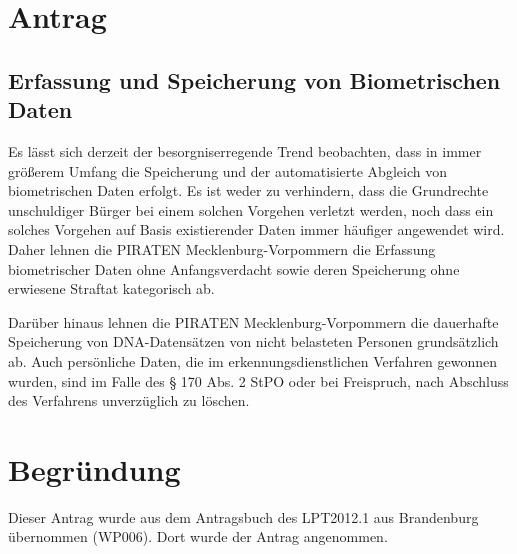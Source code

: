 \section{Antrag}

\subsection{Erfassung und Speicherung von Biometrischen Daten}

Es lässt sich derzeit der besorgniserregende Trend beobachten, dass in immer größerem Umfang die Speicherung und der automatisierte Abgleich von biometrischen Daten erfolgt. Es ist weder zu verhindern, dass die Grundrechte unschuldiger Bürger bei einem solchen Vorgehen verletzt werden, noch dass ein solches Vorgehen auf Basis existierender Daten immer häufiger angewendet wird. Daher lehnen die PIRATEN Mecklenburg-Vorpommern die Erfassung biometrischer Daten ohne Anfangsverdacht sowie deren Speicherung ohne erwiesene Straftat kategorisch ab.

Darüber hinaus lehnen die PIRATEN Mecklenburg-Vorpommern die dauerhafte Speicherung von DNA-Datensätzen von nicht belasteten Personen grundsätzlich ab. Auch persönliche Daten, die im erkennungsdienstlichen Verfahren gewonnen wurden, sind im Falle des § 170 Abs. 2 StPO oder bei Freispruch, nach Abschluss des Verfahrens unverzüglich zu löschen.

\section{Begründung}

Dieser Antrag wurde aus dem Antragsbuch des LPT2012.1 aus Brandenburg übernommen (WP006). Dort wurde der Antrag angenommen.
